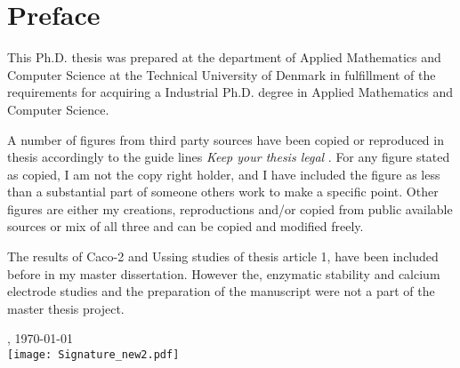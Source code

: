 \chapter{Preface}
This Ph.D. thesis was prepared at the department of Applied Mathematics and Computer Science at the Technical University of Denmark in fulfillment of the requirements for acquiring a Industrial Ph.D. degree in Applied Mathematics and Computer Science.

A number of figures from third party sources have been copied or reproduced in thesis accordingly to the guide lines \textit{Keep your thesis legal} \cite{johnson2015keeping}. For any figure stated as copied, I am not the copy right holder, and I have included the figure as less than a substantial part of someone others work to make a specific point. Other figures are either my creations, reproductions and/or copied from public available sources or mix of all three and can be copied and modified freely.

The results of Caco-2 and Ussing studies of thesis article 1, have been included before in my master dissertation. However the, enzymatic stability and calcium electrode studies and the preparation of the manuscript were not a part of the master thesis project.

\vfill

{
\centering
    \thesislocation{}, \today\\[1cm]
    \hspace{3cm}\texttt{[image: Signature\_new2.pdf]}\\[1cm]
\begin{flushright}
    \thesisauthor{}
\end{flushright}
}